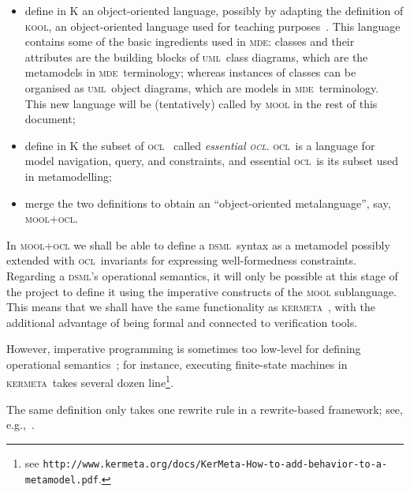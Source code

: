 \documentclass[a4paper,11pt,twoside]{article}
\newcommand{\dsml}{\textsc{dsml}}
\newcommand{\mde}{\textsc{mde}}
\newcommand{\kmt}{\textsc{kermeta}}
\newcommand{\uml}{\textsc{uml}}
\newcommand{\ocl}{\textsc{ocl}}
\begin{document}
\begin{itemize}
\item define in K an object-oriented language, possibly by adapting the definition of  \textsc{kool}, an object-oriented language used for teaching purposes~\cite{hills-rosu-2007-rta}. This language contains some of the basic ingredients used in \mde: classes and their attributes are the building blocks of \uml\ class diagrams,
which are the metamodels in \mde\ terminology; whereas
instances of classes can be organised as \uml\ object diagrams, which are models in \mde\ terminology. This new language will be (tentatively)  called by \textsc{mool} in the rest of this document;

\item define in K the subset of  \ocl~\cite{ocl} called \emph{essential \ocl}. \ocl\ is a language for model navigation, 
 query, and constraints, and essential \ocl\  is its  subset used in metamodelling;
\item merge  the two definitions to obtain an ``object-oriented metalanguage'', say, \textsc{mool+ocl}.
\end{itemize}

In \textsc{mool+ocl}  we shall be able to define a \dsml\ syntax as a metamodel possibly extended with \ocl\ invariants for expressing well-formedness constraints. Regarding a  \dsml's operational semantics, it will only  be possible
at this stage of the project to define it using the imperative constructs of the \textsc{mool} sublanguage. This means that we shall have the same functionality as \kmt~\cite{DBLP:conf/uml/MullerFJ05}, with the additional advantage of being formal and connected to verification tools. 


 However,  imperative programming is sometimes too low-level for defining operational semantics~; for instance, executing
finite-state machines in \kmt\ takes several dozen line\footnote{see \texttt{http://www.kermeta.org/docs/KerMeta-How-to-add-behavior-to-a-metamodel.pdf}.}.

The same definition only takes one  rewrite  rule in a rewrite-based framework; see, e.g.,~\cite{r10b}. 
\end{document}
